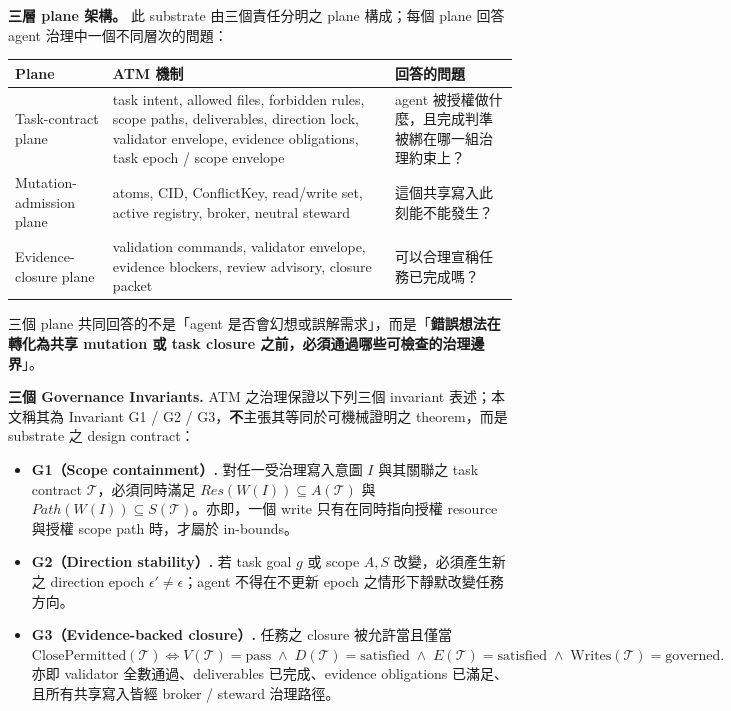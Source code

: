 \documentclass[a4paper,fontset=none]{ctexart}
\begin{document}
\textbf{三層 plane 架構。} 此 substrate 由三個責任分明之 plane 構成；每個 plane 回答 agent 治理中一個不同層次的問題：

\begingroup
\footnotesize
{}
\begin{longtable}{L{0.28\textwidth}L{0.28\textwidth}L{0.28\textwidth}}
\toprule
Plane & ATM 機制 & 回答的問題 \\
\midrule
Task-contract plane & task intent, allowed files, forbidden rules, scope paths, deliverables, direction lock, validator envelope, evidence obligations, task epoch / scope envelope & agent 被授權做什麼，且完成判準被綁在哪一組治理約束上？ \\
Mutation-admission plane & atoms, CID, ConflictKey, read/write set, active registry, broker, neutral steward & 這個共享寫入此刻能不能發生？ \\
Evidence-closure plane & validation commands, validator envelope, evidence blockers, review advisory, closure packet & 可以合理宣稱任務已完成嗎？ \\
\bottomrule
\end{longtable}
\endgroup

三個 plane 共同回答的不是「agent 是否會幻想或誤解需求」，而是「\textbf{錯誤想法在轉化為共享 mutation 或 task closure 之前，必須通過哪些可檢查的治理邊界}」。

\textbf{三個 Governance Invariants.} ATM 之治理保證以下列三個 invariant 表述；本文稱其為 Invariant G1 / G2 / G3，\textbf{不}主張其等同於可機械證明之 theorem，而是 substrate 之 design contract：

\begin{itemize}
\item \textbf{G1（Scope containment）.} 對任一受治理寫入意圖 $I$ 與其關聯之 task contract $\mathcal{T}$，必須同時滿足 $Res(W(I)) \subseteq A(\mathcal{T})$ 與 $Path(W(I)) \subseteq S(\mathcal{T})$。亦即，一個 write 只有在同時指向授權 resource 與授權 scope path 時，才屬於 in-bounds。
\item \textbf{G2（Direction stability）.} 若 task goal $g$ 或 scope $A, S$ 改變，必須產生新之 direction epoch $\epsilon' \neq \epsilon$；agent 不得在不更新 epoch 之情形下靜默改變任務方向。
\item \textbf{G3（Evidence-backed closure）.} 任務之 closure 被允許當且僅當
$\text{ClosePermitted}(\mathcal{T}) \iff V(\mathcal{T}) = \text{pass} \;\land\; D(\mathcal{T}) = \text{satisfied} \;\land\; E(\mathcal{T}) = \text{satisfied} \;\land\; \text{Writes}(\mathcal{T}) = \text{governed}.$ 亦即 validator 全數通過、deliverables 已完成、evidence obligations 已滿足、且所有共享寫入皆經 broker / steward 治理路徑。

\end{itemize}
\end{document}
